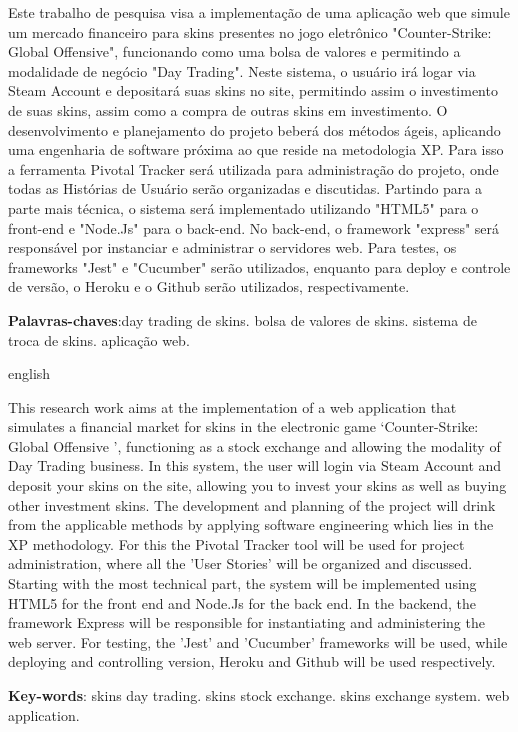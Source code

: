 
\setlength{\absparsep}{18pt} %
\begin{resumo}
Este trabalho de pesquisa visa a implementação de uma aplicação web que simule um
mercado financeiro para skins presentes no jogo eletrônico "Counter-Strike: Global
Offensive", funcionando como uma bolsa de valores e permitindo a modalidade de
negócio "Day Trading". Neste sistema, o usuário irá logar via Steam Account e
depositará suas skins no site, permitindo assim o investimento de suas skins, assim como
a compra de outras skins em investimento. O desenvolvimento e planejamento do
projeto beberá dos métodos ágeis, aplicando uma engenharia de software próxima ao
que reside na metodologia XP. Para isso a ferramenta Pivotal Tracker será utilizada
para administração do projeto, onde todas as Histórias de Usuário serão organizadas e
discutidas. Partindo para a parte mais técnica, o sistema será implementado utilizando
"HTML5" para o front-end e "Node.Js" para o back-end. No back-end, o framework
"express" será responsável por instanciar e administrar o servidores web. Para testes, os
frameworks "Jest" e "Cucumber" serão utilizados, enquanto para deploy e controle de
versão, o Heroku e o Github serão utilizados, respectivamente.


 \textbf{Palavras-chaves}:day trading de skins. bolsa de valores de skins. sistema de troca de
skins. aplicação web.
\end{resumo}

\begin{resumo}[Abstract]
 \begin{otherlanguage*}{english}
   \vspace{\onelineskip}

This research work aims at the implementation of a web application that simulates a
financial market for skins in the electronic game ‘Counter-Strike: Global
Offensive ', functioning as a stock exchange and allowing the modality of
Day Trading business. In this system, the user will login via Steam Account and
deposit your skins on the site, allowing you to invest your skins as well as
buying other investment skins. The development and planning of the
project will drink from the applicable methods by applying software engineering
which lies in the XP methodology. For this the Pivotal Tracker tool will be used
for project administration, where all the 'User Stories' will be organized and
discussed. Starting with the most technical part, the system will be implemented using
HTML5 for the front end and Node.Js for the back end. In the backend, the framework
Express will be responsible for instantiating and administering the web server. For testing, the
'Jest' and 'Cucumber' frameworks will be used, while deploying and controlling
version, Heroku and Github will be used respectively.

 
   \noindent 
   \textbf{Key-words}: skins day trading. skins stock exchange. skins exchange system. web application.
 \end{otherlanguage*}
\end{resumo}